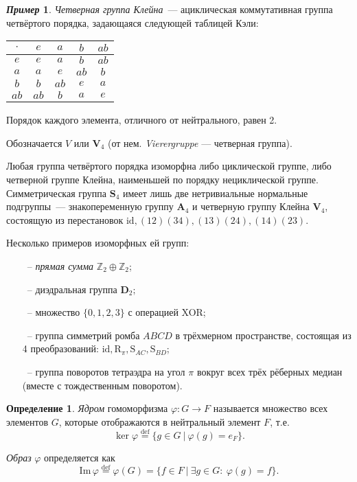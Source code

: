 \documentclass[a4paper, 14pt]{extarticle}
\newcommand{\deq}{\stackrel{\mathrm{def}}{=}}
\newcommand{\n}{\par}
\newcommand{\integers}{\mathbb{Z}}
\newcommand{\quaternary}{\mathbf{V}_4}
\newcommand{\dihedral}{\mathbf{D}}
\newcommand{\symmetrical}{\mathbf{S}}
\newcommand{\alternating}{\mathbf{A}}
\newcommand{\suchthat}{{:}{ } \ }
\newcommand{\im}{\mathrm{Im} \,}
\newcommand{\id}{\mathrm{id}}
\newcommand{\Rot}{\mathrm{R}}
\newcommand{\Sym}{\mathrm{S}}
\renewcommand{\phi}{\varphi}
\theoremstyle{definition}
\newtheorem*{exmpl*}{\textit{Пример}}
\newtheorem{definition}{Определение}
\theoremstyle{plain}
\numberwithin{theorem}{section}
\numberwithin{definition}{section}
\numberwithin{statement}{section}
\numberwithin{lemma}{section}
\numberwithin{consequence}{section}
\begin{document}
	\newpage
	\begin{exmpl*}
		\textit{Четверная группа Клейна}~--- ациклическая коммутативная группа четвёртого порядка, задающаяся следующей таблицей Кэли: \n
		
		\begin{center}
			\begin{tabular}{c |c c c c}
				$\cdot$ & $e$ & $a$ & $b$ & $ab$\\
				\hline
				$e$ & $e$ & $a$ & $b$ & $ab$\\
				
				$a$ & $a$ & $e$ & $ab$ & $b$\\
				
				$b$ & $b$ & $ab$ & $e$ & $a$\\
				
				$ab$ & $ab$ & $b$ & $a$ & $e$\\
			\end{tabular}
		\end{center} \n
		Порядок каждого элемента, отличного от нейтрального, равен 2. \n
		Обозначается $V$ или $\quaternary$ (от нем. \textit{Vierergruppe} — четверная группа). \n
		Любая группа четвёртого порядка изоморфна либо циклической группе, либо четверной группе Клейна, наименьшей по порядку нециклической группе. Симметрическая группа $\symmetrical_4$ имеет лишь две нетривиальные нормальные подгруппы~--- знакопеременную группу $\alternating_4$ и четверную группу Клейна $\quaternary$, состоящую из перестановок ${\mathrm{id}, (12)(34), (13)(24), (14)(23).}$ \n
		Несколько примеров изоморфных ей групп:
		\begin{itemize}
			\setlength\itemsep{0.1em}
			\item[~--] \textit{прямая сумма} $\integers_2 \oplus \integers_2$;
			\item[~--] диэдральная группа $\dihedral_2;$
			\item[~--] множество ${\{0, 1, 2, 3\}}$ с операцией XOR;
			\item[~--] группа симметрий ромба $ABCD$ в трёхмерном пространстве, состоящая из 4 преобразований: ${\id, \Rot_\pi, \Sym_{AC}, \Sym_{BD}}$;
			\item[~--] группа поворотов тетраэдра на угол $\pi$ вокруг всех трёх рёберных медиан (вместе с тождественным поворотом).
		\end{itemize}
	\end{exmpl*}
	\newpage
	\begin{definition}
		\textit{Ядром} гомоморфизма ${\phi: G \rightarrow F}$ называется множество всех элементов $G$, которые отображаются в нейтральный элемент $F$, т.е.
		\begin{equation*}
			\ker \phi \deq \{g \in G \ | \ \phi(g) = e_F\}.
		\end{equation*} \n
		\textit{Образ} $\phi$ определяется как
		\begin{equation*}
			\im \phi \deq \phi(G) = \{f \in F \ | \ \exists g \in G \suchthat \phi(g) = f\}.
		\end{equation*}
	\end{definition}
\end{document}
